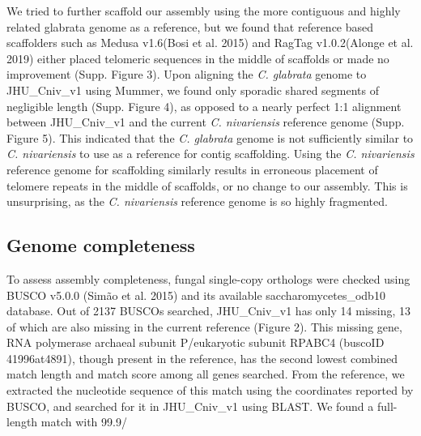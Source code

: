 We tried to further scaffold our assembly using the more contiguous and highly related glabrata genome as a reference, but we found that reference based scaffolders such as Medusa v1.6(Bosi et al. 2015) and RagTag v1.0.2(Alonge et al. 2019) either placed telomeric sequences in the middle of scaffolds or made no improvement (Supp. Figure 3). Upon aligning the \textit{C. glabrata} genome to JHU\_Cniv\_v1 using Mummer, we found only sporadic shared segments of negligible length (Supp. Figure 4), as opposed to a nearly perfect 1:1 alignment between JHU\_Cniv\_v1 and the current \textit{C. nivariensis} reference genome (Supp. Figure 5). This indicated that the \textit{C. glabrata} genome is not sufficiently similar to \textit{C. nivariensis} to use as a reference for contig scaffolding. Using the \textit{C. nivariensis} reference genome for scaffolding similarly results in erroneous placement of telomere repeats in the middle of scaffolds, or no change to our assembly. This is unsurprising, as the \textit{C. nivariensis} reference genome is so highly fragmented.




\subsection{Genome completeness}
\label{sec:gencomp}

To assess assembly completeness, fungal single-copy orthologs were checked using BUSCO v5.0.0 (Simão et al. 2015) and its available saccharomycetes\_odb10 database. Out of 2137 BUSCOs searched, JHU\_Cniv\_v1 has only 14 missing, 13 of which are also missing in the current reference (Figure 2). This missing gene, RNA polymerase archaeal subunit P/eukaryotic subunit RPABC4 (buscoID 41996at4891), though present in the reference, has the second lowest combined match length and match score among all genes searched. From the reference, we extracted the nucleotide sequence of this match using the coordinates reported by BUSCO, and searched for it in JHU\_Cniv\_v1 using BLAST. We found a full-length match with 99.9/%

